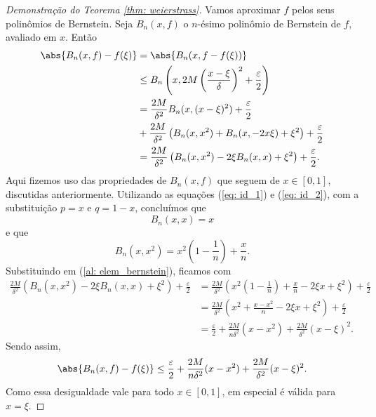 \begin{proof}[Demonstração do Teorema \ref{thm: weierstrass}]
    Vamos aproximar \( f \) pelos seus polinômios de Bernstein.
    Seja \( B_{ n }(x, f) \) o \( n \)-ésimo polinômio de Bernstein de \( f \), avaliado em \( x \).
    Então
    \begin{align}
        \abs{ B_{ n } (x, f) - f(\xi) }
        &= \abs{B_{ n } (x, f - f(\xi))} \\
        &\leq  B_{ n } \left( x, 2M \left( \frac{ x - \xi }{ \delta } \right)^2 + \frac{ \varepsilon }{ 2 } \right) \\
        &= \frac{ 2M }{ \delta^2 } B_{ n } (x, ( x - \xi )^2) + \frac{ \varepsilon }{ 2 } \\
        &+ \frac{ 2M }{ \delta^2 } \left( B_{ n } (x, x^2) + B_{ n } (x, -2 x \xi) + \xi^2 \right) + \frac{ \varepsilon }{ 2 } \\
        &= \frac{ 2M }{ \delta^2 } \left( B_{ n } (x, x^2) - 2 \xi B_{ n } (x, x) + \xi^2 \right) + \frac{ \varepsilon }{ 2 }
        \label{al: elem_bernstein}
    .\end{align}
    Aqui fizemos uso das propriedades de \( B_{ n } (x, f) \) que seguem de \( x \in [0, 1] \), discutidas anteriormente.
    Utilizando as equações (\ref{eq: id_1}) e (\ref{eq: id_2}), com a substituição \( p = x \) e \( q = 1 - x \), concluímos que \[
        B_{ n } (x, x) = x
    \]
    e que \[
        B_{ n } (x, x^2) = x^2 \left( 1 - \frac{ 1 }{ n } \right) + \frac{ x }{ n }
    .\]
    Substituindo em (\ref{al: elem_bernstein}), ficamos com
    \begin{align}
        \frac{ 2M }{ \delta^2 } \left( B_{ n } (x, x^2) - 2 \xi B_{ n } (x, x) + \xi^2 \right) + \frac{ \varepsilon }{ 2 } &=
        \frac{ 2M }{ \delta^2 } \left( 
            x^2 \left( 1 - \frac{ 1 }{ n } \right) + \frac{ x }{ n }
            - 2 \xi x
            + \xi^2
         \right) + \frac{ \varepsilon }{ 2 } \\
         &= \frac{ 2M }{ \delta^2 } \left( 
             x^2 + \frac{ x - x^2 }{ n } - 2 \xi x + \xi^2
          \right) + \frac{ \varepsilon }{ 2 } \\
         &= \frac{ \varepsilon }{ 2 } + \frac{ 2M }{ n \delta^2 } ( x - x^2 ) + \frac{ 2M }{ \delta^2 } ( x - \xi )^2
    .\end{align}
    Sendo assim, 
    \begin{equation}
        \abs{ B_{ n } (x, f) - f(\xi) } \leq \frac{ \varepsilon }{ 2 } + \frac{ 2M }{ n \delta^2 } ( x - x^2 ) + \frac{ 2M }{ \delta^2 } ( x - \xi )^2
    .\end{equation}
    Como essa desigualdade vale para todo \( x \in [0, 1] \), em especial é válida para \( x = \xi \).

\end{proof}
